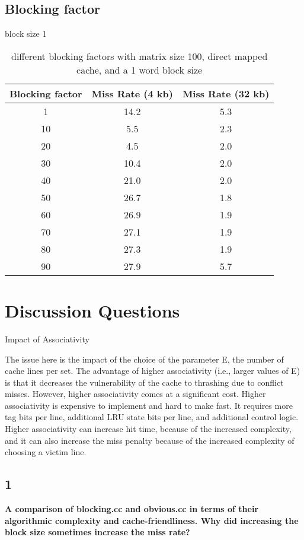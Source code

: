 \documentclass[letterpaper, 12pt, oneside]{memoir}
\begin{document}
\subsection{Blocking factor}
block size 1

\begin{table}[H]
\centering
\begin{tabular}{c|c|c}
    Blocking factor & Miss Rate (4 kb) & Miss Rate (32 kb) \\ \hline
    1   & 14.2  & 5.3 \\
    10  & 5.5   & 2.3 \\
    20  & 4.5   & 2.0 \\
    30  & 10.4  & 2.0 \\
    40  & 21.0  & 2.0 \\
    50  & 26.7  & 1.8 \\
    60  & 26.9  & 1.9 \\
    70  & 27.1  & 1.9 \\
    80  & 27.3  & 1.9 \\
    90  & 27.9  & 5.7 \\
\end{tabular}
\caption{different blocking factors with matrix size 100, direct mapped cache, and a 1 word block size}
\end{table}

\section{Discussion Questions}


Impact of Associativity

The issue here is the impact of the choice of the parameter E, the number of
cache lines per set. The advantage of higher associativity (i.e., larger values of E)
is that it decreases the vulnerability of the cache to thrashing due to conflict misses.
However, higher associativity comes at a significant cost. Higher associativity is
expensive to implement and hard to make fast. It requires more tag bits per
line, additional LRU state bits per line, and additional control logic. Higher
associativity can increase hit time, because of the increased complexity, and it can
also increase the miss penalty because of the increased complexity of choosing a
victim line.


\subsection{1}
\textbf{A comparison of blocking.cc and obvious.cc in terms of their algorithmic 
complexity and cache-friendliness. Why did increasing the block size sometimes 
increase the miss rate?}
\end{document}
